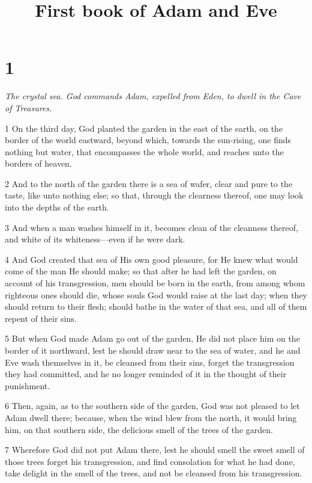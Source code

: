 

\title{First book of Adam and Eve}

\chapter{1}

\par \textit{The crystal sea. God commands Adam, expelled from Eden, to dwell in the Cave of Treasures.}

\par 1 On the third day, God planted the garden in the east of the earth, on the border of the world eastward, beyond which, towards the sun-rising, one finds nothing but water, that encompasses the whole world, and reaches unto the borders of heaven.

\par 2 And to the north of the garden there is a sea of wafer, clear and pure to the taste, like unto nothing else; so that, through the clearness thereof, one may look into the depths of the earth.

\par 3 And when a man washes himself in it, becomes clean of the cleanness thereof, and white of its whiteness—even if he were dark.

\par 4 And God created that sea of His own good pleasure, for He knew what would come of the man He should make; so that after he had left the garden, on account of his transgression, men should be born in the earth, from among whom righteous ones should die, whose souls God would raise at the last day; when they should return to their flesh; should bathe in the water of that sea, and all of them repent of their sins.

\par 5 But when God made Adam go out of the garden, He did not place him on the border of it northward, lest he should draw near to the sea of water, and he and Eve wash themselves in it, be cleansed from their sins, forget the transgression they had committed, and he no longer reminded of it in the thought of their punishment.

\par 6 Then, again, as to the southern side of the garden, God was not pleased to let Adam dwell there; because, when the wind blew from the north, it would bring him, on that southern side, the delicious smell of the trees of the garden.

\par 7 Wherefore God did not put Adam there, lest he should smell the sweet smell of those trees forget his transgression, and find consolation for what he had done, take delight in the smell of the trees, and not be cleansed from his transgression.

